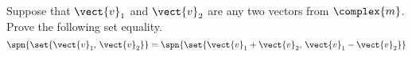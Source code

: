 Suppose that $\vect{v}_1$ and $\vect{v}_2$ are any two vectors from $\complex{m}$.  Prove the following set equality.  
%
\begin{equation*}
\spn{\set{\vect{v}_1,\,\vect{v}_2}}
=
\spn{\set{\vect{v}_1+\vect{v}_2,\,\vect{v}_1-\vect{v}_2}}
\end{equation*}
%